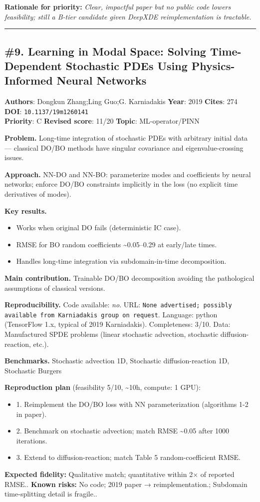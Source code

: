 \documentclass[10pt,letterpaper]{article}
\begin{document}
\textbf{Rationale for priority:} \emph{Clear, impactful paper but no public code lowers feasibility; still a B-tier candidate given DeepXDE reimplementation is tractable.}

\medskip\hrule\medskip

\subsection*{\#9. Learning in Modal Space: Solving Time-Dependent Stochastic PDEs Using Physics-Informed Neural Networks}
\textbf{Authors}: Dongkun Zhang;Ling Guo;G. Karniadakis \textbullet{} \textbf{Year}: 2019 \textbullet{} \textbf{Cites}: 274 \textbullet{} \textbf{DOI}: \texttt{10.1137/19m1260141} \\
\textbf{Priority}: C \textbullet{} \textbf{Revised score}: 11/20 \textbullet{} \textbf{Topic}: ML-operator/PINN

\textbf{Problem.} Long-time integration of stochastic PDEs with arbitrary initial data — classical DO/BO methods have singular covariance and eigenvalue-crossing issues.

\textbf{Approach.} NN-DO and NN-BO: parameterize modes and coefficients by neural networks; enforce DO/BO constraints implicitly in the loss (no explicit time derivatives of modes).

\textbf{Key results.}
\begin{itemize}
\item Works when original DO fails (deterministic IC case).
\item RMSE for BO random coefficients \~{}0.05–0.29 at early/late times.
\item Handles long-time integration via subdomain-in-time decomposition.
\end{itemize}

\textbf{Main contribution.} Trainable DO/BO decomposition avoiding the pathological assumptions of classical versions.

\textbf{Reproducibility.} Code available: \emph{no}. URL: \texttt{None advertised; possibly available from Karniadakis group on request}. Language: python (TensorFlow 1.x, typical of 2019 Karniadakis). Completeness: 3/10. Data: Manufactured SPDE problems (linear stochastic advection, stochastic diffusion-reaction, etc.).

\textbf{Benchmarks.} Stochastic advection 1D, Stochastic diffusion-reaction 1D, Stochastic Burgers

\textbf{Reproduction plan} (feasibility 5/10, \textasciitilde10h, compute: 1 GPU):
\begin{itemize}
\item 1. Reimplement the DO/BO loss with NN parameterization (algorithms 1-2 in paper).
\item 2. Benchmark on stochastic advection; match RMSE \~{}0.05 after 1000 iterations.
\item 3. Extend to diffusion-reaction; match Table 5 random-coefficient RMSE.
\end{itemize}
\textbf{Expected fidelity:} Qualitative match; quantitative within 2× of reported RMSE.. \textbf{Known risks:} No code; 2019 paper → reimplementation.; Subdomain time-splitting detail is fragile..
\end{document}

